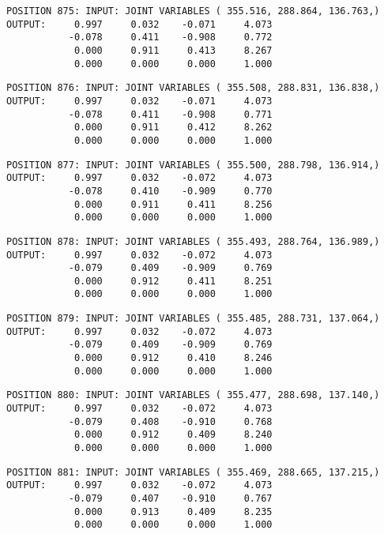 \begin{verbatim}
POSITION 875: INPUT: JOINT VARIABLES ( 355.516, 288.864, 136.763,)
OUTPUT:     0.997     0.032    -0.071     4.073
           -0.078     0.411    -0.908     0.772
            0.000     0.911     0.413     8.267
            0.000     0.000     0.000     1.000
\end{verbatim} \pagebreak[1]\begin{verbatim}
POSITION 876: INPUT: JOINT VARIABLES ( 355.508, 288.831, 136.838,)
OUTPUT:     0.997     0.032    -0.071     4.073
           -0.078     0.411    -0.908     0.771
            0.000     0.911     0.412     8.262
            0.000     0.000     0.000     1.000
\end{verbatim} \pagebreak[1]\begin{verbatim}
POSITION 877: INPUT: JOINT VARIABLES ( 355.500, 288.798, 136.914,)
OUTPUT:     0.997     0.032    -0.072     4.073
           -0.078     0.410    -0.909     0.770
            0.000     0.911     0.411     8.256
            0.000     0.000     0.000     1.000
\end{verbatim} \pagebreak[1]\begin{verbatim}
POSITION 878: INPUT: JOINT VARIABLES ( 355.493, 288.764, 136.989,)
OUTPUT:     0.997     0.032    -0.072     4.073
           -0.079     0.409    -0.909     0.769
            0.000     0.912     0.411     8.251
            0.000     0.000     0.000     1.000
\end{verbatim} \pagebreak[1]\begin{verbatim}
POSITION 879: INPUT: JOINT VARIABLES ( 355.485, 288.731, 137.064,)
OUTPUT:     0.997     0.032    -0.072     4.073
           -0.079     0.409    -0.909     0.769
            0.000     0.912     0.410     8.246
            0.000     0.000     0.000     1.000
\end{verbatim} \pagebreak[1]\begin{verbatim}
POSITION 880: INPUT: JOINT VARIABLES ( 355.477, 288.698, 137.140,)
OUTPUT:     0.997     0.032    -0.072     4.073
           -0.079     0.408    -0.910     0.768
            0.000     0.912     0.409     8.240
            0.000     0.000     0.000     1.000
\end{verbatim} \pagebreak[1]\begin{verbatim}
POSITION 881: INPUT: JOINT VARIABLES ( 355.469, 288.665, 137.215,)
OUTPUT:     0.997     0.032    -0.072     4.073
           -0.079     0.407    -0.910     0.767
            0.000     0.913     0.409     8.235
            0.000     0.000     0.000     1.000
\end{verbatim} \pagebreak[1]\begin{verbatim}

\end{verbatim}
